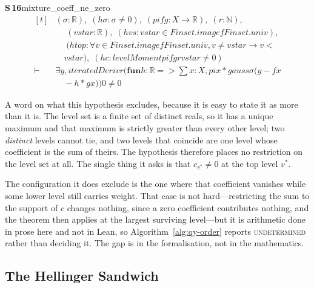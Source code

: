 \documentclass[conference]{IEEEtran}
\theoremstyle{definition}
\newcommand{\lean}[1]{\textsf{\footnotesize #1}}
\begin{document}
\noindent\textbf{S\,16}\quad\lean{mixture\_coeff\_ne\_zero}
{\footnotesize\[ \begin{aligned}[t]
&(\sigma : \mathbb{R} ),\; (\mathit{hσ} : \sigma \neq 0),\; (\mathit{pi} \mathit{f} \mathit{g} : \mathit{X} \to \mathbb{R} ),\; (\mathit{r} : \mathbb{N} ),\\
&\quad \; (\mathit{vstar} : \mathbb{R} ),\; (\mathit{hvs} : \mathit{vstar} \in \mathit{Finset}.\mathit{image} \mathit{f} \mathit{Finset}.\mathit{univ}),\\
&\quad \; (\mathit{htop} : \forall \mathit{v} \in \mathit{Finset}.\mathit{image} \mathit{f} \mathit{Finset}.\mathit{univ}, \mathit{v} \neq \mathit{vstar} \to \mathit{v} <\\
&\quad \mathit{vstar}),\; (\mathit{hc} : \mathit{levelMoment} \mathit{pi} \mathit{f} \mathit{g} \mathit{r} \mathit{vstar} \neq 0)\\
\vdash\;&\exists \mathit{y}, \mathit{iteratedDeriv} \mathit{r} (\mathbf{fun} \mathit{h} : \mathbb{R} => \textstyle\sum \mathit{x} : \mathit{X}, \mathit{pi} \mathit{x} * \mathit{gauss} \sigma (\mathit{y} - \mathit{f} \mathit{x}\\
&\quad - \mathit{h} * \mathit{g} \mathit{x})) 0 \neq 0
\end{aligned} \]}


A word on what this hypothesis excludes, because it is easy to state it as more than it is.
The level set is a finite set of distinct reals, so it has a unique maximum and that maximum
is strictly greater than every other level; two \emph{distinct} levels cannot tie, and two
levels that coincide are one level whose coefficient is the sum of theirs. The hypothesis
therefore places no restriction on the level set at all. The single thing it asks is that
$c_{v^{*}}\neq0$ at the top level $v^{*}$.

The configuration it does exclude is the one where that coefficient vanishes while some lower
level still carries weight. That case is not hard---restricting the sum to the support of $c$
changes nothing, since a zero coefficient contributes nothing, and the theorem then applies
at the largest surviving level---but it is arithmetic done in prose here and not in Lean, so
Algorithm~\ref{alg:qy-order} reports \textsc{undetermined} rather than deciding it. The gap is
in the formalisation, not in the mathematics.

\subsection{The Hellinger Sandwich}
\label{sec:qy-sandwich}
\end{document}
